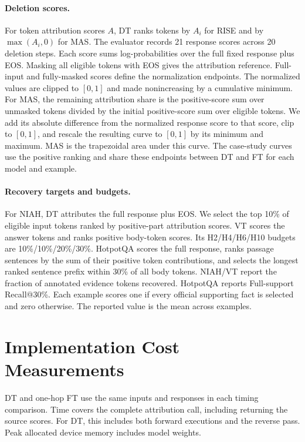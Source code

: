 \paragraph{Deletion scores.}
For token attribution scores $A$, DT ranks tokens by $A_i$ for RISE and by $\max(A_i,0)$ for MAS. The evaluator records 21 response scores across 20 deletion steps. Each score sums log-probabilities over the full fixed response plus EOS. Masking all eligible tokens with EOS gives the attribution reference. Full-input and fully-masked scores define the normalization endpoints. The normalized values are clipped to $[0,1]$ and made nonincreasing by a cumulative minimum. For MAS, the remaining attribution share is the positive-score sum over unmasked tokens divided by the initial positive-score sum over eligible tokens. We add its absolute difference from the normalized response score to that score, clip to $[0,1]$, and rescale the resulting curve to $[0,1]$ by its minimum and maximum. MAS is the trapezoidal area under this curve. The case-study curves use the positive ranking and share these endpoints between DT and FT for each model and example.

\paragraph{Recovery targets and budgets.}
For NIAH, DT attributes the full response plus EOS. We select the top 10\% of eligible input tokens ranked by positive-part attribution scores. VT scores the answer tokens and ranks positive body-token scores. Its H2/H4/H6/H10 budgets are 10\%/10\%/20\%/30\%. HotpotQA scores the full response, ranks passage sentences by the sum of their positive token contributions, and selects the longest ranked sentence prefix within 30\% of all body tokens. NIAH/VT report the fraction of annotated evidence tokens recovered. HotpotQA reports Full-support Recall@30\%. Each example scores one if every official supporting fact is selected and zero otherwise. The reported value is the mean across examples.



\section{Implementation Cost Measurements}
\label{app:cost}
DT and one-hop FT use the same inputs and responses in each timing comparison. Time covers the complete attribution call, including returning the source scores. For DT, this includes both forward executions and the reverse pass. Peak allocated device memory includes model weights.

